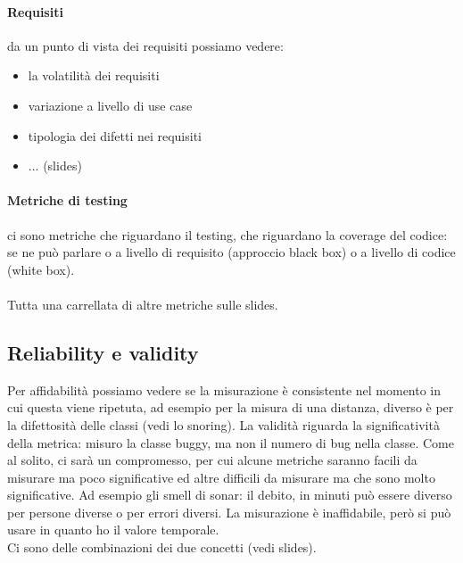 \documentclass{article}
\begin{document}
\paragraph{Requisiti} da un punto di vista dei requisiti possiamo vedere:
\begin{itemize}
\item la volatilità dei requisiti
\item variazione a livello di use case
\item tipologia dei difetti nei requisiti
\item ... (slides)
\end{itemize}
\paragraph{Metriche di testing} ci sono metriche che riguardano il testing, che riguardano la coverage del codice: se ne può parlare o a livello di requisito (approccio black box) o a livello di codice (white box).\\\\ Tutta una carrellata di altre metriche sulle slides.
\subsection{Reliability e validity}
Per affidabilità possiamo vedere se la misurazione è consistente nel momento in cui questa viene ripetuta, ad esempio per la misura di una distanza, diverso è per la difettosità delle classi (vedi lo snoring). La validità riguarda la significatività della metrica: misuro la classe buggy, ma non il numero di bug nella classe. Come al solito, ci sarà un compromesso, per cui alcune metriche saranno facili da misurare ma poco significative ed altre difficili da misurare ma che sono molto significative. Ad esempio gli smell di sonar: il debito, in minuti può essere diverso per persone diverse o per errori diversi. La misurazione è inaffidabile, però si può usare in quanto ho il valore temporale.\\ Ci sono delle combinazioni dei due concetti (vedi slides).
\end{document}
